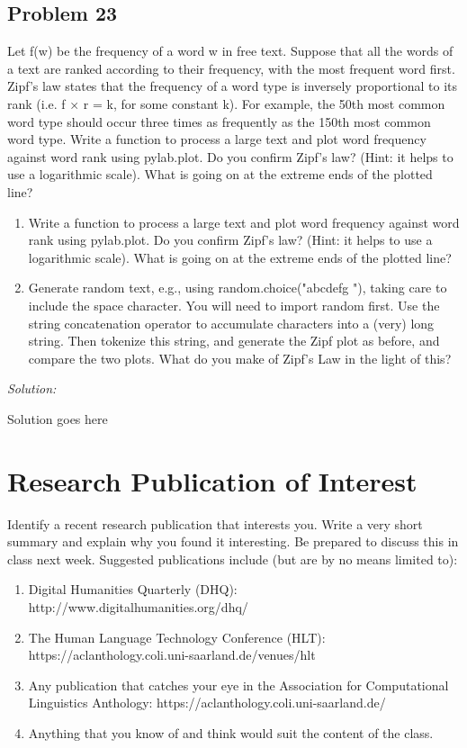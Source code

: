 \documentclass[11pt]{article}
\newenvironment{solution}{
	\vspace{10px}\noindent\emph{Solution:}
}{
	\vspace{10px}
}
\begin{document}
\subsection*{Problem 23}
Let f(w) be the frequency of a word w in free text. Suppose that all the words of a text are ranked according to their frequency, with the most frequent word first. Zipf's law states that the frequency of a word type is inversely proportional to its rank (i.e. f × r = k, for some constant k). For example, the 50th most common word type should occur three times as frequently as the 150th most common word type.
Write a function to process a large text and plot word frequency against word rank using pylab.plot. Do you confirm Zipf's law? (Hint: it helps to use a logarithmic scale). What is going on at the extreme ends of the plotted line?
\begin{enumerate}
	\item Write a function to process a large text and plot word frequency against word rank using pylab.plot. Do you confirm Zipf's law? (Hint: it helps to use a logarithmic scale). What is going on at the extreme ends of the plotted line?
	\item Generate random text, e.g., using random.choice("abcdefg "), taking care to include the space character. You will need to import random first. Use the string concatenation operator to accumulate characters into a (very) long string. Then tokenize this string, and generate the Zipf plot as before, and compare the two plots. What do you make of Zipf's Law in the light of this?
\end{enumerate}

\begin{solution}
	Solution goes here
\end{solution}  


\section*{Research Publication of Interest} Identify a recent research publication that interests you. Write a very short summary and explain why you found it interesting. Be prepared to discuss this in class next week. Suggested publications include (but are by no means limited to): 

\begin{enumerate}
	\item Digital Humanities Quarterly (DHQ): http://www.digitalhumanities.org/dhq/ 
	
	\item The Human Language Technology Conference (HLT): https://aclanthology.coli.uni-saarland.de/venues/hlt
	
	\item Any publication that catches your eye in the Association for Computational Linguistics Anthology: https://aclanthology.coli.uni-saarland.de/ 
	
	\item Anything that you know of and think would suit the content of the class.
	
	
\end{enumerate}
\end{document}
